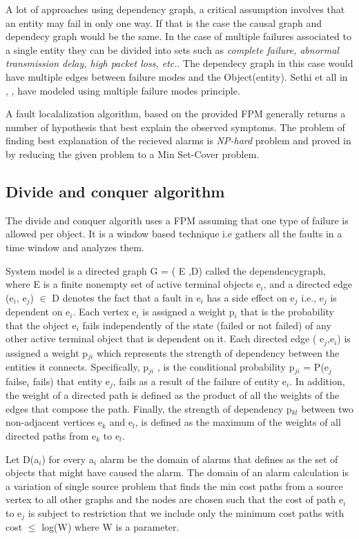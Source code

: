 \documentclass[10pt]{sigplan-proc-varsize}
\begin{document}
A lot of approaches using dependency graph, a critical assumption involves that an entity may fail in only one way. If that is the case the causal graph and dependecy graph would be the same.  In the case of multiple failures associated to a single entity they can be divided into sets such as {\it{complete failure, abnormal transmission delay, high packet loss, etc.}}. The dependecy graph in this case would have multiple edges between failure modes and the Object(entity). Sethi et all in \cite{Sethi:02}, \cite{Sethi:041}, \cite{Sethi:04} have modeled using multiple failure modes principle. 

A fault localalization algorithm, based on the provided FPM generally returns a number of hypothesis that best explain the observed symptoms. The problem of finding best explanation of the recieved alarms is {\it{NP-hard}} problem and proved in \cite{Katzela:95} by reducing the given problem to a Min Set-Cover problem.

\subsection{Divide and conquer algorithm}
The divide and conquer algorith uses a FPM assuming that one type of failure is allowed per object. It is a window based technique i.e gathers all the faults in a time window and analyzes them. 

System model is a directed graph G = ( E ,D) called the dependencygraph, where E is a finite nonempty set of active terminal objects e$_i$, and a directed edge (e$_i$, e$_j$) $\in$ D denotes the fact that a fault in e$_i$ has a side effect on e$_j$ i.e., e$_j$ is dependent on e$_i$.
Each vertex e$_i$ is assigned a weight p$_i$ that is the probability that the object e$_i$ fails independently of the state (failed or not failed) of any other active terminal object that is dependent on it. Each directed edge ( e$_j$,e$_i$) is assigned a weight p$_{ji}$ which represents the strength of dependency between the entities it connects. Specifically, p$_{ji}$ , is the conditional probability p$_{ji}$ = P(e$_j$ fails\textbar e$_i$ fails) that entity e$_j$, fails as a result of the failure of entity e$_i$. In addition, the weight of a directed path is defined as the product of all the weights of the edges that compose the path. Finally, the strength of dependency p$_{kl}$ between two non-adjacent vertices e$_k$ and e$_l$, is defined as the maximum of the weights of all directed paths from e$_k$ to e$_l$.

Let D(a$_i$) for every a$_i$ alarm be the domain of alarms that defines as the set of objects that might have caused the alarm.  The domain of an alarm calculation is a variation of single source problem that finds the min cost paths from a source vertex to all other graphs and the nodes are chosen such that the cost of path e$_i$ to e$_j$ is subject to restriction that we include only the minimum cost paths with cost $\leq$ log(W) where W is a parameter.
\end{document}
